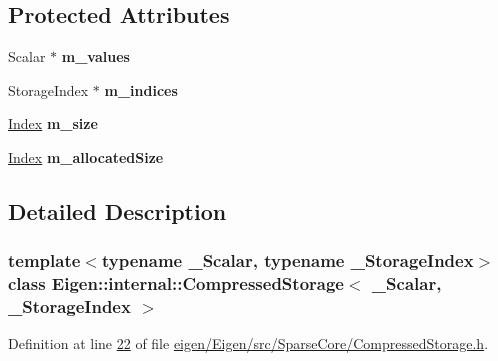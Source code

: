 \subsection*{Protected Attributes}
\begin{DoxyCompactItemize}
\item 
\mbox{\label{class_eigen_1_1internal_1_1_compressed_storage_a5b942ac6b5f157f4d6e74fe6b234bb9d}} 
Scalar $\ast$ {\bfseries m\+\_\+values}
\item 
\mbox{\label{class_eigen_1_1internal_1_1_compressed_storage_a575310a84a7b063285678f72b5ced095}} 
Storage\+Index $\ast$ {\bfseries m\+\_\+indices}
\item 
\mbox{\label{class_eigen_1_1internal_1_1_compressed_storage_a8ef874ccc231de5fa4ee688092d31d1f}} 
\hyperlink{namespace_eigen_a62e77e0933482dafde8fe197d9a2cfde}{Index} {\bfseries m\+\_\+size}
\item 
\mbox{\label{class_eigen_1_1internal_1_1_compressed_storage_a9e133beed1bcc4582da39c00d9d08ee2}} 
\hyperlink{namespace_eigen_a62e77e0933482dafde8fe197d9a2cfde}{Index} {\bfseries m\+\_\+allocated\+Size}
\end{DoxyCompactItemize}


\subsection{Detailed Description}
\subsubsection*{template$<$typename \+\_\+\+Scalar, typename \+\_\+\+Storage\+Index$>$\newline
class Eigen\+::internal\+::\+Compressed\+Storage$<$ \+\_\+\+Scalar, \+\_\+\+Storage\+Index $>$}



Definition at line \hyperlink{eigen_2_eigen_2src_2_sparse_core_2_compressed_storage_8h_source_l00022}{22} of file \hyperlink{eigen_2_eigen_2src_2_sparse_core_2_compressed_storage_8h_source}{eigen/\+Eigen/src/\+Sparse\+Core/\+Compressed\+Storage.\+h}.



